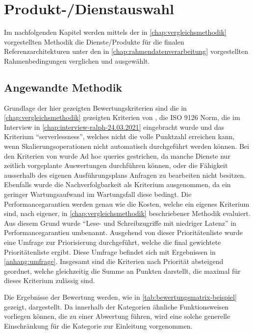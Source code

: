 \chapter{Produkt-/Dienstauswahl}
Im nachfolgenden Kapitel werden mittels der in \autoref{chap:vergleichsmethodik} vorgestellten Methodik die Dienste/Produkte für die finalen Referenzarchitekturen unter den in \autoref{chap:rahmendatenverarbeitung} vorgestellten Rahmenbedingungen verglichen und ausgewählt.

\section{Angewandte Methodik}

Grundlage der hier gezeigten Bewertungskriterien sind die in \autoref{chap:vergleichsmethodik} gezeigten Kriterien von \citeauthor{Marz.2015}, die ISO 9126 Norm, die im Interview in \autoref{chap:interview-ralph-24.03.2021} eingebracht wurde und das Kriterium \enquote{serverlessness}, welches nicht die volle Punktzahl erreichen kann, wenn Skalierungsoperationen nicht automatisch durchgeführt werden können. Bei den Kriterien von \citeauthor{Marz.2015} wurde Ad hoc queries gestrichen, da manche Dienste nur zeitlich vorgeplante Auswertungen durchführen können, oder die Fähigkeit ausserhalb des eigenen Ausführungsplans Anfragen zu bearbeiten nicht besitzen. Ebenfalls wurde die Nachverfolgbarkeit als Kriterium ausgenommen, da ein geringer Wartungsaufwand im Wartungsfall diese bedingt. Die Performancegarantien werden genau wie die Kosten, welche ein eigenes Kriterium sind, nach eigener, in \autoref{chap:vergleichsmethodik} beschriebener Methodik evaluiert. Aus diesem Grund wurde \enquote{Lese- und Schreibzugriffe mit niedriger Latenz} in Performancegarantien umbenannt. Ausgehend von dieser Prioritätenliste wurde eine Umfrage zur Priorisierung durchgeführt, welche die final gewichtete Prioritätenliste ergibt. Diese Umfrage befindet sich mit Ergebnissen in \autoref{anhang:umfrage}. Insgesamt sind die Kriterien nach Priorität absteigend geordnet, welche gleichzeitig die Summe an Punkten darstellt, die maximal für dieses Kriterium zulässig sind.



Die Ergebnisse der Bewertung werden, wie in \autoref{tab:bewertungsmatrix-beispiel} gezeigt, dargestellt.  Da innerhalb der Kategorien ähnliche Funktionsweisen vorliegen können, die zu einer Abwertung führen, wird eine solche generelle Einschränkung für die Kategorie zur Einleitung vorgenommen.

